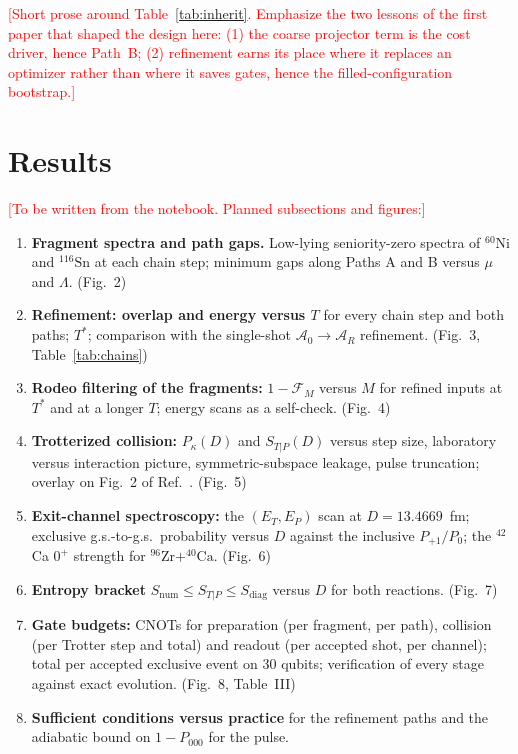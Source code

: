 \documentclass[
  aps,
  prc,
  reprint,
  superscriptaddress,
  floatfix,
  nofootinbib
]{revtex4-2}
\newcommand{\todo}[1]{\textcolor{red}{[#1]}}
\newcommand{\Snum}{S_{\mathrm{num}}}
\newcommand{\Sdiag}{S_{\mathrm{diag}}}
\newcommand{\Sn}{^{116}\mathrm{Sn}}
\newcommand{\Ni}{^{60}\mathrm{Ni}}
\newcommand{\Zr}{^{96}\mathrm{Zr}}
\newcommand{\Ca}{^{40}\mathrm{Ca}}
\begin{document}
\todo{Short prose around Table~\ref{tab:inherit}.  Emphasize the two
lessons of the first paper that shaped the design here: (1) the coarse
projector term is the cost driver, hence Path~B; (2) refinement earns its
place where it replaces an optimizer rather than where it saves gates,
hence the filled-configuration bootstrap.}

\section{Results}
\label{sec:results}
\todo{To be written from the notebook.  Planned subsections and figures:}
\begin{enumerate}
  \item \textbf{Fragment spectra and path gaps.}  Low-lying seniority-zero
  spectra of $\Ni$ and $\Sn$ at each chain step; minimum gaps along Paths A
  and B versus $\mu$ and $\Lambda$.  (Fig.~2)
  \item \textbf{Refinement: overlap and energy versus $T$} for every chain
  step and both paths; $T^*$; comparison with the single-shot
  $\mathcal A_0\to\mathcal A_R$ refinement.  (Fig.~3, Table~\ref{tab:chains})
  \item \textbf{Rodeo filtering of the fragments:} $1-\mathcal F_M$ versus
  $M$ for refined inputs at $T^*$ and at a longer $T$; energy scans as a
  self-check.  (Fig.~4)
  \item \textbf{Trotterized collision:} $P_\kappa(D)$ and $S_{T|P}(D)$ versus
  step size, laboratory versus interaction picture, symmetric-subspace
  leakage, pulse truncation; overlay on Fig.~2 of
  Ref.~\cite{TwoFragment2026}.  (Fig.~5)
  \item \textbf{Exit-channel spectroscopy:} the $(E_T,E_P)$ scan at
  $D=13.4669$~fm; exclusive g.s.-to-g.s.\ probability versus $D$ against
  the inclusive $P_{+1}/P_0$; the $^{42}$Ca $0^+$ strength for $\Zr+\Ca$.
  (Fig.~6)
  \item \textbf{Entropy bracket} $\Snum\le S_{T|P}\le\Sdiag$ versus $D$ for
  both reactions.  (Fig.~7)
  \item \textbf{Gate budgets:} CNOTs for preparation (per fragment, per
  path), collision (per Trotter step and total) and readout (per accepted
  shot, per channel); total per accepted exclusive event on 30 qubits;
  verification of every stage against exact evolution.  (Fig.~8, Table~III)
  \item \textbf{Sufficient conditions versus practice} for the refinement
  paths and the adiabatic bound on $1-P_{000}$ for the pulse.
\end{enumerate}
\end{document}

